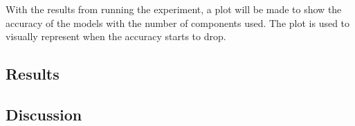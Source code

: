 With the results from running the experiment, a plot will be made to show the accuracy of the models with the number of components used. The plot is used to visually represent when the accuracy starts to drop. 


\subsection{Results}\label{subsec:experiment_2_results}

\subsection{Discussion}\label{subsec:experiment_2_discussion}



